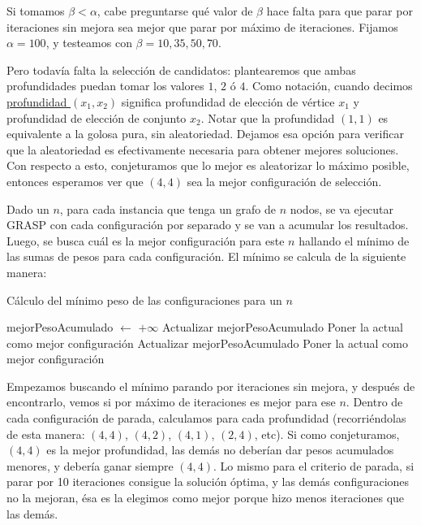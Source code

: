 Si tomamos $\beta < \alpha$, cabe preguntarse qué valor de $\beta$ hace falta para que parar por iteraciones sin mejora sea mejor que parar por máximo de iteraciones. Fijamos $\alpha = 100$, y testeamos con $\beta = 10, 35, 50, 70$.

Pero todavía falta la selección de candidatos: plantearemos que ambas profundidades puedan tomar los valores $1$, $2$ ó $4$. Como notación, cuando decimos \underline{profundidad $(x_1,x_2)$} significa profundidad de elección de vértice $x_1$ y profundidad de elección de conjunto $x_2$. Notar que la profundidad $(1,1)$ es equivalente a la golosa pura, sin aleatoriedad. Dejamos esa opción para verificar que la aleatoriedad es efectivamente necesaria para obtener mejores soluciones. Con respecto a esto, conjeturamos que lo mejor es aleatorizar lo máximo posible, entonces esperamos ver que $(4,4)$ sea la mejor configuración de selección.

Dado un $n$, para cada instancia que tenga un grafo de $n$ nodos, se va ejecutar GRASP con cada configuración por separado y se van a acumular los resultados. Luego, se busca cuál es la mejor configuración para este $n$ hallando el mínimo de las sumas de pesos para cada configuración. El mínimo se calcula de la siguiente manera:
\begin{algorithm}[H]
\begin{algorithmic}[1]
\caption{Cálculo del mínimo peso de las configuraciones para un $n$}
\STATE mejorPesoAcumulado $\leftarrow$ $+ \infty$
                \STATE Actualizar mejorPesoAcumulado
                \STATE Poner la actual como mejor configuración
            \ENDIF
        \ENDFOR
    \ENDFOR
\ENDFOR
{}
                \STATE Actualizar mejorPesoAcumulado
                \STATE Poner la actual como mejor configuración
            \ENDIF
        \ENDFOR
    \ENDFOR
\ENDFOR
\end{algorithmic}
\end{algorithm}
Empezamos buscando el mínimo parando por iteraciones sin mejora, y después de encontrarlo, vemos si por máximo de iteraciones es mejor para ese $n$. Dentro de cada configuración de parada, calculamos para cada profundidad (recorriéndolas de esta manera: $(4,4)$, $(4,2)$, $(4,1)$, $(2,4)$, etc). Si como conjeturamos, $(4,4)$ es la mejor profundidad, las demás no deberían dar pesos acumulados menores, y debería ganar siempre $(4,4)$. Lo mismo para el criterio de parada, si parar por 10 iteraciones consigue la solución óptima, y las demás configuraciones no la mejoran, ésa es la elegimos como mejor porque hizo menos iteraciones que las demás.

